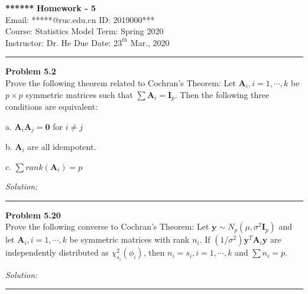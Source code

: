 \documentclass[a4paper, 11pt]{article}
\newenvironment{problem}[2][Problem]
    { \begin{mdframed}[backgroundcolor=gray!20] \textbf{#1 #2} \\}
    {  \end{mdframed}}
\newenvironment{solution}
    {\textit{Solution:}}
    {}
\begin{document}
\noindent
\large\textbf{******} \hfill \textbf{Homework - 5}   \\
Email: *****@ruc.edu.cn \hfill ID: 2019000*** \\
\normalsize Course: Statistics Model \hfill Term: Spring 2020\\
Instructor: Dr. He  \hfill Due Date: $23^{th}$ Mar., 2020 \\
\noindent\rule{7in}{2.8pt}

\begin{problem}{5.2}
Prove the following theorem related to Cochran’s Theorem: Let $\mathbf{A}_i, i = 1, \cdots , k$
be $p × p$ symmetric matrices such that $\sum \mathbf{A}_i = \mathbf{I}_p$. Then the following three
conditions are equivalent:

a. $\mathbf{A}_{i} \mathbf{A}_{j}=\mathbf{0}$ for $i \neq j$

b. $\mathbf{A}_{i}$ are all idempotent.

c. $\sum r a n k\left(\mathbf{A}_{i}\right)=p$
\end{problem}
\begin{solution}


\end{solution} 

\noindent\rule{7in}{2.8pt}


\begin{problem}{5.20}
	Prove the following converse to Cochran’s Theorem: Let $\mathbf{y} \sim N_{p}\left(\mu, \sigma^{2} \mathbf{I}_{p}\right)$ and
	let $\mathbf{A}_i, i = 1,\cdots, k$ be symmetric matrices with rank $n_i$. If $\left(1 / \sigma^{2}\right) \mathbf{y}^{T} \mathbf{A}_{i} \mathbf{y}$ are
	independently distributed as $\chi_{s_{i}}^{2}\left(\phi_{i}\right)$, then $n_i = s_i, i = 1, \cdots , k$ and $\sum n_i = p$.
\end{problem}
\begin{solution}
	
\end{solution} 

\noindent\rule{7in}{2.8pt}
\end{document}
